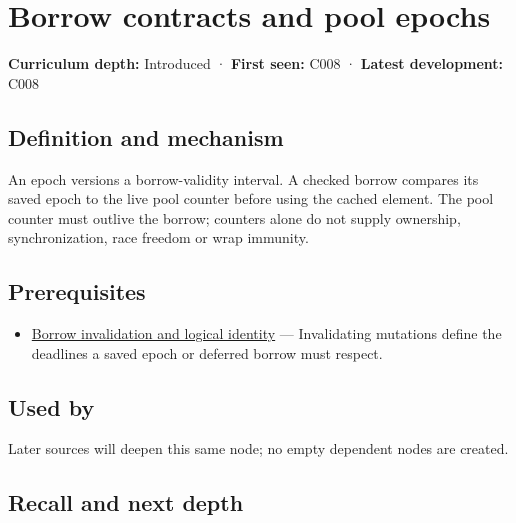 \hypertarget{appendix-aa405b7c3903}{}\label{referencestart:appendix-aa405b7c3903}
\section{Borrow contracts and pool epochs}\label{appendix-aa405b7c3903-borrow-contracts-and-pool-epochs}

\textbf{Curriculum depth:} Introduced · \textbf{First seen:} C008 · \textbf{Latest development:} C008

\begin{allmightroledefinition}

\subsection{Definition and mechanism}\label{appendix-aa405b7c3903-definition-and-mechanism}

An epoch versions a borrow-validity interval. A checked borrow compares its saved epoch to the live pool counter before using the cached element. The pool counter must outlive the borrow; counters alone do not supply ownership, synchronization, race freedom or wrap immunity.

\end{allmightroledefinition}

\subsection{Prerequisites}\label{appendix-aa405b7c3903-prerequisites}

\begin{itemize}
\tightlist
\item
  \hyperref[appendix-f9b8b9188c7f]{Borrow invalidation and logical identity} --- Invalidating mutations define the deadlines a saved epoch or deferred borrow must respect.
\end{itemize}

\subsection{Used by}\label{appendix-aa405b7c3903-used-by}

Later sources will deepen this same node; no empty dependent nodes are created.

\subsection{Recall and next depth}\label{appendix-aa405b7c3903-recall-and-next-depth}

